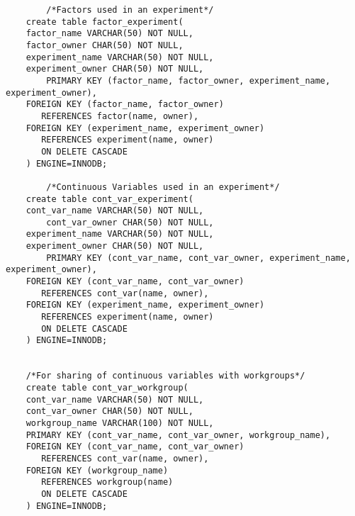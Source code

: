 \begin{tiny}
\begin{verbatim}
        /*Factors used in an experiment*/
 	create table factor_experiment(
 	factor_name VARCHAR(50) NOT NULL,
 	factor_owner CHAR(50) NOT NULL,
 	experiment_name VARCHAR(50) NOT NULL,
 	experiment_owner CHAR(50) NOT NULL,
        PRIMARY KEY (factor_name, factor_owner, experiment_name, experiment_owner),
	FOREIGN KEY (factor_name, factor_owner)
	   REFERENCES factor(name, owner),
	FOREIGN KEY (experiment_name, experiment_owner)
	   REFERENCES experiment(name, owner)
	   ON DELETE CASCADE
 	) ENGINE=INNODB;

        /*Continuous Variables used in an experiment*/
 	create table cont_var_experiment(
 	cont_var_name VARCHAR(50) NOT NULL,
        cont_var_owner CHAR(50) NOT NULL,
 	experiment_name VARCHAR(50) NOT NULL,
 	experiment_owner CHAR(50) NOT NULL,
        PRIMARY KEY (cont_var_name, cont_var_owner, experiment_name, experiment_owner),
	FOREIGN KEY (cont_var_name, cont_var_owner)
	   REFERENCES cont_var(name, owner),
	FOREIGN KEY (experiment_name, experiment_owner)
	   REFERENCES experiment(name, owner)
	   ON DELETE CASCADE
 	) ENGINE=INNODB;

	
	/*For sharing of continuous variables with workgroups*/
 	create table cont_var_workgroup(
	cont_var_name VARCHAR(50) NOT NULL,
	cont_var_owner CHAR(50) NOT NULL,
	workgroup_name VARCHAR(100) NOT NULL,
	PRIMARY KEY (cont_var_name, cont_var_owner, workgroup_name),
	FOREIGN KEY (cont_var_name, cont_var_owner)
	   REFERENCES cont_var(name, owner),
	FOREIGN KEY (workgroup_name) 
	   REFERENCES workgroup(name)
	   ON DELETE CASCADE  
	) ENGINE=INNODB;	

\end{verbatim}
\end{tiny}